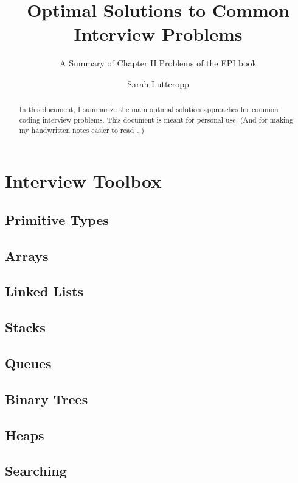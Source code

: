 \documentclass[runningheads]{llncs}
\begin{document}
%
\title{Optimal Solutions to Common Interview Problems}
\subtitle{A Summary of Chapter II.Problems of the EPI book}

\author{Sarah Lutteropp}


\maketitle

\begin{abstract}

In this document, I summarize the main optimal solution approaches for common coding interview problems. This document is meant for personal use. (And for making my handwritten notes easier to read \ldots)

\end{abstract}

\section{Interview Toolbox}

\subsection{Primitive Types}
\subsection{Arrays}
\subsection{Linked Lists}
\subsection{Stacks}
\subsection{Queues}
\subsection{Binary Trees}
\subsection{Heaps}
\subsection{Searching}
\end{document}
